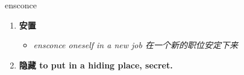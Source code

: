
\begin{frame}
{\huge ensconce}
\begin{center}
\begin{enumerate}\Large
  \item \textbf{安置}
  \begin{itemize}
    \item \em{\Large{ensconce oneself in a new job 在一个新的职位安定下来}}
  \end{itemize}
  \item \textbf{隐藏 to put in a hiding place, secret.}
\end{enumerate}
\end{center}
\end{frame}
